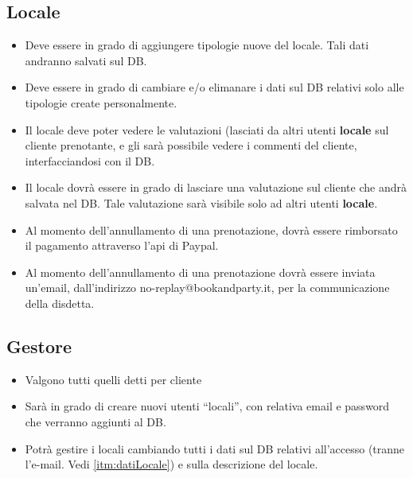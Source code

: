 \subsection{Locale}
\begin{itemize}
    \item Deve essere in grado di aggiungere tipologie nuove del locale. Tali dati andranno 
    salvati sul DB.
    \item Deve essere in grado di cambiare e/o elimanare i dati sul DB relativi solo alle 
    tipologie create personalmente.
    \item Il locale deve poter vedere le valutazioni (lasciati da altri utenti \textbf{locale} 
    sul cliente prenotante, e gli sarà possibile vedere i commenti del cliente, interfacciandosi 
    con il DB.
    \item Il locale dovrà essere in grado di lasciare una valutazione sul cliente che andrà 
    salvata nel DB. Tale valutazione sarà visibile solo ad altri utenti \textbf{locale}.
    \item Al momento dell'annullamento di una prenotazione, dovrà essere rimborsato il pagamento 
    attraverso l’api di Paypal.
    \item Al momento dell'annullamento di una prenotazione dovrà essere inviata un'email,
    dall'indirizzo no-replay@bookandparty.it, per la communicazione della disdetta.
\end{itemize}

\subsection{Gestore}
\begin{itemize}    
    \item Valgono tutti quelli detti per cliente
    \item Sarà in grado di creare nuovi utenti “locali”, con relativa email e password che 
    verranno aggiunti al DB.
    \item Potrà gestire i locali cambiando tutti i dati sul DB relativi all'accesso (tranne 
    l’e-mail. Vedi \ref{itm:datiLocale}) e sulla descrizione del locale.
\end{itemize}
